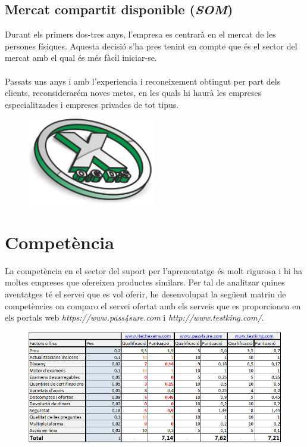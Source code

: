\documentclass[12pt]{article}
\begin{document}
\subsection{Mercat compartit disponible (\textit{SOM})}
Durant els primers dos-tres anys, l'empresa es centrarà en el mercat de les persones físiques. Aquesta decisió s'ha pres tenint en compte que és el sector del mercat amb el qual és més fàcil iniciar-se. 
\\\\Passats uns anys i amb l'experiencia i reconeixement obtingut per part dels clients, reconsiderarém noves metes, en les quals hi haurà les empreses especialitzades i empreses privades de tot tipus.
\begin{landscape}
\begin{figure}
	\centering
	\includegraphics[width=0.5\textwidth]{imatges/icon.png}\par\vspace{1cm}
\end{figure}
\end{landscape}



\clearpage
\section{Competència}
La competència en el sector del suport per l'aprenentatge és molt rigurosa i hi ha moltes empreses que ofereixen productes similars. Per tal de analitzar quines aventatges té el servei que es vol oferir, he desenvolupat la següent matriu de competències on comparo el servei ofertat amb els serveis que es proporcionen en els portals web \textit{https://www.pass4sure.com} i \textit{http://www.testking.com/}.
\begin{landscape}
\begin{figure}
	\centering
	\includegraphics[width=1.5\textwidth]{imatges/matriu.png}
\end{figure}
\end{landscape}
\clearpage
\end{document}
